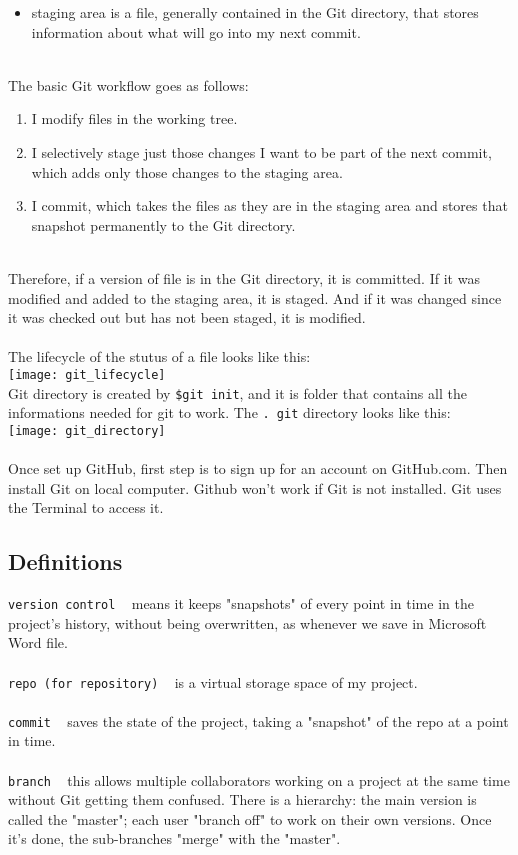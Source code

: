 \documentclass{article}
\begin{document}
{{\begin{itemize}
  \item staging area is a file, generally contained in the Git directory, that stores information about what will go into my next commit. 
\end{itemize}
\\
The basic Git workflow goes as follows:
\begin{enumerate}
  \item I modify files in the working tree.
  \item I selectively stage just those changes I want to be part of the next commit, which adds only those changes to the staging area.
  \item I commit, which takes the files as they are in the staging area and stores that snapshot permanently to the Git directory. 
\end{enumerate}
\\
Therefore, if a version of file is in the Git directory, it is committed. If it was modified and added to the staging area, it is staged. And if it was changed since it was checked out but has not been staged, it is modified. \\
\\
The lifecycle of the stutus of a file looks like this:\\
\texttt{[image: git\_lifecycle]}\\
Git directory is created by \texttt{\$git init}, and it is folder that contains all the informations needed for git to work. The \texttt{. git} directory looks like this:\\
\texttt{[image: git\_directory]}\\
\\
Once
\To set up GitHub, first step is to sign up for an account on GitHub.com. Then install Git on local computer. Github won't work if Git is not installed. Git uses the Terminal to access it. \\ 
\subsection{Definitions}
\texttt{version control} ~ means it keeps "snapshots" of every point in time in the project's history, without being overwritten, as whenever we save in Microsoft Word file.\\
\\
\texttt{repo (for repository)} ~ is a virtual storage space of my project. \\
\\
\texttt{commit} ~  saves the state of the project, taking a "snapshot" of the repo at a point in time.\\
\\
\texttt{branch} ~ this allows multiple collaborators working on a project at the same time without Git getting them confused. There is a hierarchy: the main version is called the "master"; each user "branch off" to work on their own versions. Once it's done, the sub-branches "merge" with the "master". \\


}}
\end{document}
